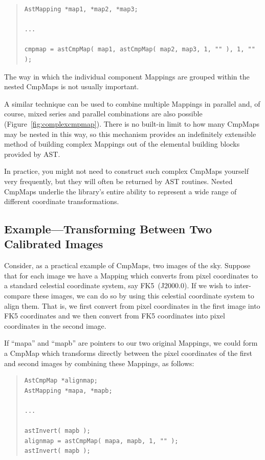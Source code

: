 \documentclass[twoside,11pt]{article}
\newcommand{\htmlref}[2]{#1}
\begin{document}
\begin{quote}
\small
\begin{verbatim}
AstMapping *map1, *map2, *map3;

...

cmpmap = astCmpMap( map1, astCmpMap( map2, map3, 1, "" ), 1, "" );
\end{verbatim}
\normalsize
\end{quote}

The way in which the individual component Mappings are grouped within
the nested CmpMaps is not usually important.

A similar technique can be used to combine multiple Mappings in
parallel and, of course, mixed series and parallel combinations are
also possible (Figure~\ref{fig:complexcmpmap}).  There is no built-in
limit to how many CmpMaps may be nested in this way, so this mechanism
provides an indefinitely extensible method of building complex
Mappings out of the elemental building blocks provided by AST.

In practice, you might not need to construct such complex CmpMaps
yourself very frequently, but they will often be returned by AST
routines.  Nested CmpMaps underlie the library's entire ability to
represent a wide range of different coordinate transformations.

\subsection{\label{ss:cmpmapexample}Example---Transforming Between Two Calibrated Images}

Consider, as a practical example of CmpMaps, two images of the
sky. Suppose that for each image we have a \htmlref{Mapping}{Mapping} which converts from
pixel coordinates to a standard celestial coordinate system, say
FK5~(J2000.0). If we wish to inter-compare these images, we can do so
by using this celestial coordinate system to align them. That is, we
first convert from pixel coordinates in the first image into FK5
coordinates and we then convert from FK5 coordinates into pixel
coordinates in the second image.

If ``mapa'' and ``mapb'' are pointers to our two original Mappings, we
could form a \htmlref{CmpMap}{CmpMap} which transforms directly between the pixel
coordinates of the first and second images by combining these
Mappings, as follows:

\begin{quote}
\small
\begin{verbatim}
AstCmpMap *alignmap;
AstMapping *mapa, *mapb;

...

astInvert( mapb );
alignmap = astCmpMap( mapa, mapb, 1, "" );
astInvert( mapb );
\end{verbatim}
\normalsize
\end{quote}
\end{document}
